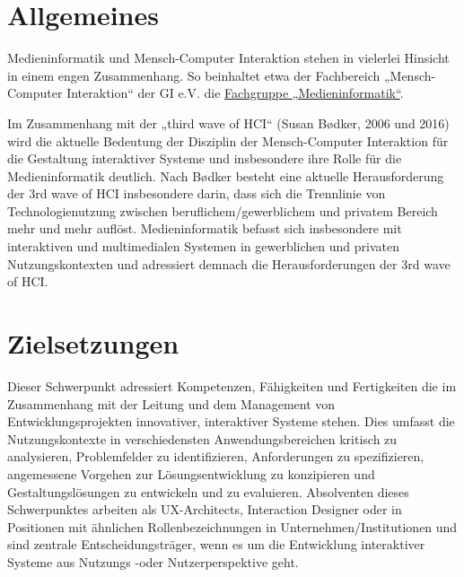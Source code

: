 \section*{Allgemeines\label{/mi-2017/modulbeschreibungen-master/schwerpunkt-human-computer-interaction}}\label{allgemeinespathlabelmi-2017modulbeschreibungen-masterschwerpunkt-human-computer-interaction}

Medieninformatik und Mensch-Computer Interaktion stehen in vielerlei
Hinsicht in einem engen Zusammenhang. So beinhaltet etwa der Fachbereich
„Mensch-Computer Interaktion`` der GI e.V. die
\href{http://fb-mci.gi.de/mensch-computer-interaktion-mci/fachgruppen/medieninformatik.html}{Fachgruppe
„Medieninformatik``}.

Im Zusammenhang mit der „third wave of HCI`` (Susan Bødker, 2006 und
2016) wird die aktuelle Bedeutung der Disziplin der Mensch-Computer
Interaktion für die Gestaltung interaktiver Systeme und insbesondere
ihre Rolle für die Medieninformatik deutlich. Nach Bødker besteht eine
aktuelle Herausforderung der 3rd wave of HCI insbesondere darin, dass
sich die Trennlinie von Technologienutzung zwischen
beruflichem/gewerblichem und privatem Bereich mehr und mehr auflöst.
Medieninformatik befasst sich insbesondere mit interaktiven und
multimedialen Systemen in gewerblichen und privaten Nutzungskontexten
und adressiert demnach die Herausforderungen der 3rd wave of HCI.

\section*{Zielsetzungen\label{/mi-2017/modulbeschreibungen-master/schwerpunkt-human-computer-interaction}}\label{zielsetzungenpathlabelmi-2017modulbeschreibungen-masterschwerpunkt-human-computer-interaction}

Dieser Schwerpunkt adressiert Kompetenzen, Fähigkeiten und Fertigkeiten
die im Zusammenhang mit der Leitung und dem Management von
Entwicklungsprojekten innovativer, interaktiver Systeme stehen. Dies
umfasst die Nutzungskontexte in verschiedensten Anwendungsbereichen
kritisch zu analysieren, Problemfelder zu identifizieren, Anforderungen
zu spezifizieren, angemessene Vorgehen zur Lösungsentwicklung zu
konzipieren und Gestaltungslösungen zu entwickeln und zu evaluieren.
Absolventen dieses Schwerpunktes arbeiten als UX-Architects, Interaction
Designer oder in Positionen mit ähnlichen Rollenbezeichnungen in
Unternehmen/Institutionen und sind zentrale Entscheidungsträger, wenn es
um die Entwicklung interaktiver Systeme aus Nutzungs -oder
Nutzerperspektive geht.

